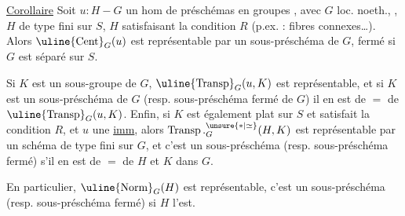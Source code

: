 \uline{Corollaire} Soit $u:H-G$ un hom de préschémas en groupes , avec $G$ loc. noeth., , $H$ de type fini sur $S$,  $H$  satisfaisant la condition $R$ (p.ex. : fibres connexes\ldots).  Alors $\uline{\operatorname{Cent}}_G(u)$ est représentable par un sous-préschéma  de $G$,  fermé si $G$ est séparé sur $S$.

Si $K$ est un sous-groupe de $G$,    $\uline{\operatorname{Transp}}_G(u,K)$ est représentable, et si $K$ est un sous-préschéma de $G$ (resp. sous-préschéma fermé de $G$) il en est de $=$ de $\uline{\operatorname{Transp}}_G(u,K)$. Enfin, si  $K$ est également plat  sur $S$ et satisfait la condition $R$,  et $u$ une \uline{imm}, alors  $\operatorname{Transp}.^{\unsure{*|\simeq}}_G(H,K)$ est représentable par un  schéma de type fini sur $G$, et c'est un sous-préschéma (resp. sous-préschéma fermé) s'il en est de $=$ de $H$ et $K$ dans $G$.

En particulier, $\uline{\operatorname{Norm}}_G(H)$ est représentable, c'est un sous-préschéma (resp. sous-préschéma fermé)  si $H$ l'est.
